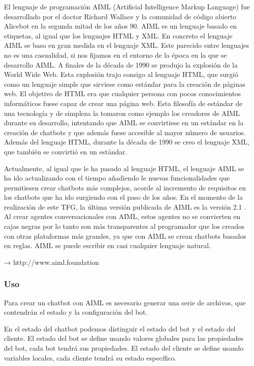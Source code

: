 El lenguaje de programación AIML (Artificial Intelligence Markup Language) fue desarrollado por el doctor Richard Wallace y la comunidad de código abierto Alicebot en la segunda mitad de los años 90. AIML es un lenguaje basado en etiquetas, al igual que los lenguajes HTML y XML. En concreto el lenguaje AIML se baso en gran medida en el lenguaje XML. Este parecido entre lenguajes no es una casualidad, si nos fijamos en el entorno de la época en la que se desarrollo AIML. A finales de la década de 1990 se produjo la explosión de la World Wide Web. Esta explosión trajo consigo al lenguaje HTML, que surgió como un lenguaje simple que sirviese como estándar para la creación de páginas web. El objetivo de HTML era que cualquier persona con pocos conocimientos informáticos fuese capaz de crear una página web. Esta filosofía de estándar de una tecnología y de simpleza la tomaron como ejemplo los creadores de AIML durante su desarrollo, intentando que AIML se convirtiese en un estándar en la creación de chatbots y que además fuese accesible al mayor número de usuarios. Además del lenguaje HTML, durante la década de 1990 se creo el lenguaje XML, que también se convirtió en un estándar.

Actualmente, al igual que le ha pasado al lenguaje HTML, el lenguaje AIML se ha ido actualizando con el tiempo añadiendo le nuevas funcionalidades que permitiesen crear chatbots más complejos, acorde al incremento de requisitos en los chatbots que ha ido surgiendo con el paso de los años. En el momento de la realización de este TFG, la última versión publicada de AIML es la versión 2.1 . Al crear agentes conversacionales con AIML, estos agentes no se convierten en cajas negras por lo tanto son más transparentes al programador que los creados con otras plataformas más grandes, ya que con AIML se crean chatbots basados en reglas. AIML se puede escribir en casi cualquier lenguaje natural.



→ http://www.aiml.foundation

\subsubsection*{Uso}

Para crear un chatbot con AIML es necesario generar una serie de archivos, que contendrán el estado y la configuración del bot.

En el estado del chatbot podemos distinguir el estado del bot y el estado del cliente. El estado del bot se define usando valores globales para las propiedades del bot, cada bot tendrá sus propiedades. El estado del cliente se define usando variables locales, cada cliente tendrá su estado específico.

